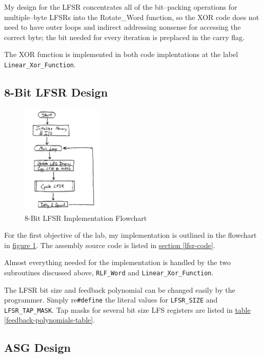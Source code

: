 \documentclass[11pt]{article}
\begin{document}
My design for the LFSR concentrates all of the bit--packing operations
for multiple--byte LFSRs into the Rotate\_Word function, so the XOR code
does not need to have outer loops and indirect addressing nonsense for
accessing the correct byte; the bit needed for every iteration is preplaced
in the carry flag.

The XOR function is implemented in both code implentations at the
label \texttt{Linear\_Xor\_Function}.

\subsection{8-Bit LFSR Design}

\begin{figure}
	\centering
	\includegraphics[width=0.35\textwidth]{Figures/8-bit-lfsr-flowchart.pdf}
	\caption{8-Bit LFSR Implementation Flowchart}
	\label{8-bit-lfsr-flowchart}
\end{figure}

For the first objective of the lab, my implementation is outlined in the
flowchart in \hyperref[8-bit-lfsr-flowchart]{figure \ref{8-bit-lfsr-flowchart}}.
The assembly source code is listed in
\hyperref[lfsr-code]{section \ref{lfsr-code}}.

Almost everything needed for the implementation is handled by the two subroutines
discussed above, \texttt{RLF\_Word} and \texttt{Linear\_Xor\_Function}.

The LFSR bit size and feedback polynomial can be changed easily by the programmer.
Simply re\texttt{\#define} the literal values for \texttt{LFSR\_SIZE} and
\texttt{LFSR\_TAP\_MASK}. Tap masks for several bit size LFS registers are listed
in \hyperref[feedback-polynomials-table]{table \ref{feedback-polynomials-table}}.

\pagebreak
\subsection{ASG Design}
\end{document}
